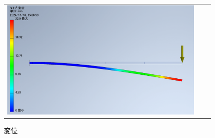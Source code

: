 \begin{figure}[H]
\begin{tabular}{ccc}
\begin{minipage}{.33\textwidth}
        \caption{応力}
        \label{img:5-1_voms}
      \end{minipage}
      \begin{minipage}{.33\textwidth}
        \centering
        \includegraphics[width=0.99\linewidth]{images/5-1_disp.png}
        \caption{変位}
        \label{img:5-1_disp}
      \end{minipage}
    \end{tabular}
  \end{figure}
